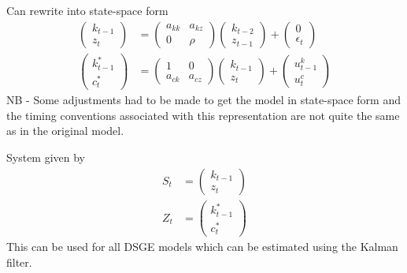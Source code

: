 \documentclass{beamer}
\begin{document}
\begin{frame}
 Can rewrite into state-space form  
\begin{align}
  \begin{pmatrix} k_{t-1} \\ z_t  \end{pmatrix} &= 
  \begin{pmatrix} a_{kk} & a_{kz} \\ 0 & \rho \end{pmatrix}
  \begin{pmatrix} k_{t-2} \\ z_{t-1} \end{pmatrix} +
  \begin{pmatrix} 0 \\ \epsilon_t \end{pmatrix}\\
  \begin{pmatrix} k^*_{t-1} \\ c^*_t \end{pmatrix} &=
  \begin{pmatrix} 1 & 0 \\ a_{ck} & a_{cz}  \end{pmatrix}
  \begin{pmatrix} k_{t-1} \\ z_t \end{pmatrix} +
  \begin{pmatrix} u^k_{t-1} \\ u^c_t \end{pmatrix}
\end{align}
 NB - Some adjustments had to be made to get the model in state-space form and the timing conventions associated with this representation are not quite the same as in the original model.
\end{frame}

\begin{frame}
  System given by
\begin{align}
  S_t &= \begin{pmatrix} k_{t-1} \\ z_t  \end{pmatrix}\\
  Z_t &= \begin{pmatrix} k^*_{t-1} \\ c^*_t \end{pmatrix}
\end{align}
 \medskip
 This can be used for all DSGE models which can be estimated using the Kalman filter. 
\end{frame}
\end{document}
